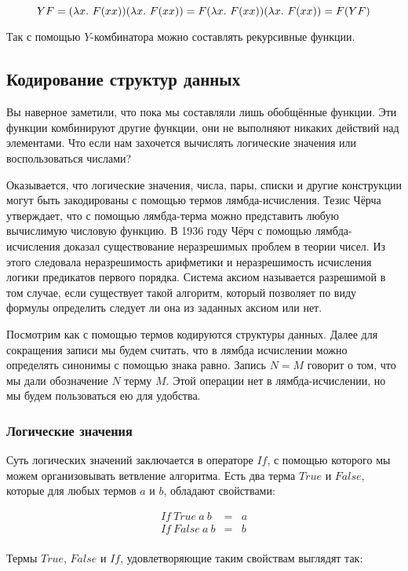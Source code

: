 \[YF = (\lambda x .\  F(xx)) (\lambda x .\  F(xx)) = 
   F (\lambda x .\  F(xx)) (\lambda x .\  F(xx)) = F(YF)\]

Так с помощью $Y$-комбинатора можно составлять рекурсивные функции.

\subsection{Кодирование структур данных}

Вы наверное заметили, что пока мы составляли лишь обобщённые функции.
Эти функции комбинируют другие функции, они не выполняют никаких
действий над элементами. Что если нам захочется вычислять логические
значения или воспользоваться числами?

Оказывается, что логические значения, числа, пары, списки и другие
конструкции могут быть закодированы с помощью термов лямбда-исчисления.
Тезис Чёрча утверждает, что с помощью лямбда-терма можно представить
любую вычислимую числовую функцию. В 1936 году Чёрч с помощью
лямбда-исчисления доказал существование неразрешимых проблем в теории
чисел. Из этого следовала неразрешимость арифметики и неразрешимость
исчисления логики предикатов первого порядка. Система аксиом называется
разрешимой в том случае, если существует такой алгоритм, который
позволяет по виду формулы определить следует ли она из заданных аксиом
или нет.

Посмотрим как с помощью термов кодируются структуры данных. Далее для
сокращения записи мы будем считать, что в лямбда исчислении можно
определять синонимы с помощью знака равно. Запись $N = M$ говорит о том,
что мы дали обозначение $N$ терму $M$. Этой операции нет в
лямбда-исчислении, но мы будем пользоваться ею для удобства.

\subsubsection{Логические значения}

Суть логических значений заключается в операторе $If$, с помощью
которого мы можем организовывать ветвление алгоритма. Есть два терма
$True$ и $False$, которые для любых термов $a$ и $b$, обладают
свойствами:

\begin{eqnarray*}
If\ True\ a\ b &=& a \\
If\ False\ a\ b &=& b \\
\end{eqnarray*}

Термы $True$, $False$ и $If$, удовлетворяющие таким свойствам выглядят
так:

